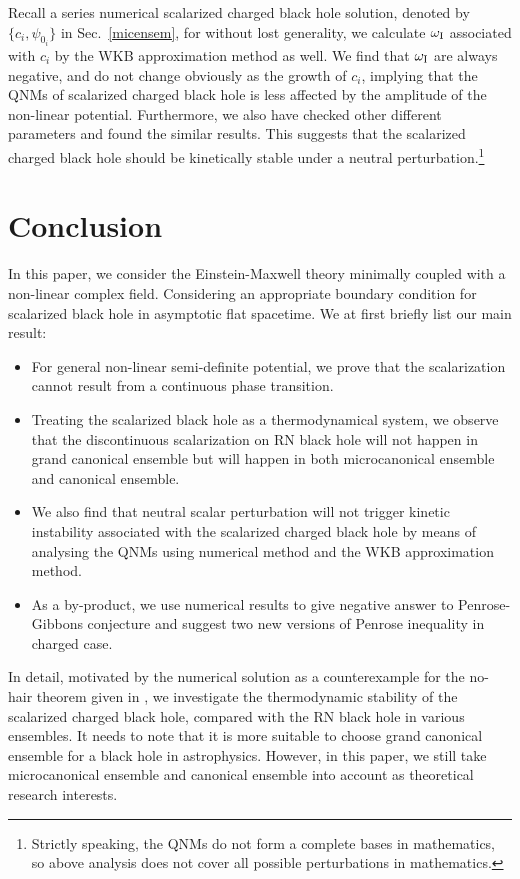 \documentclass[pr, twocolumn, preprintnumbers, showpacs,footnoteadded, superscriptaddress,nofootinbib,longbibliography]{revtex4-1}
\begin{document}
Recall a series numerical scalarized charged black hole solution, denoted by $\{c_{i}, \psi_{0_i}\}$ in Sec.~\ref{micensem}, for without lost generality, we calculate $\omega_{\rm I}$ associated with $c_i$ by the WKB approximation method as well. We find that $\omega_{\rm I}$ are always negative, and do not change obviously as the growth of $c_i$, implying that the QNMs of scalarized charged black hole is less affected by the amplitude of the non-linear potential. Furthermore, we also have checked other different parameters and found the similar results. This suggests that the scalarized charged black hole should be kinetically stable under a neutral perturbation.\footnote{Strictly speaking, the QNMs do not form a complete bases in mathematics, so above analysis does not cover all possible perturbations in mathematics. }

\section{Conclusion}\label{Conclu}
In this paper, we consider the Einstein-Maxwell theory minimally coupled with a non-linear complex field. Considering an appropriate boundary condition for scalarized black hole in asymptotic flat spacetime. We at first briefly list our main result:
%
\begin{itemize}
\item{For general non-linear semi-definite potential, we prove that the scalarization cannot result from a continuous phase transition. }


\item{Treating the scalarized black hole as a thermodynamical system, we observe that the discontinuous scalarization on RN black hole will not happen in grand canonical ensemble but will happen in both microcanonical ensemble and canonical ensemble.}

\item{We also find that neutral scalar perturbation will not trigger kinetic instability associated with the scalarized charged black hole by means of analysing the QNMs using numerical method and the WKB approximation method.}
\item{As a by-product, we use numerical results to give negative answer to Penrose-Gibbons conjecture and suggest two new versions of Penrose inequality in charged case.}
\end{itemize}
%

In detail, motivated by the numerical solution as a counterexample for the no-hair theorem given in \cite{Hong:2020miv}, we investigate the thermodynamic stability of the scalarized charged black hole, compared with the RN black hole in various ensembles. It needs to note that it is more suitable to choose grand canonical ensemble for a black hole in astrophysics. However, in this paper, we still take microcanonical ensemble and canonical ensemble into account as theoretical research interests.
\end{document}
